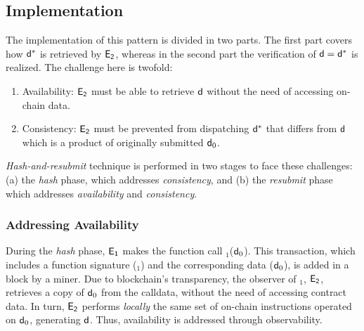 \subsection{Implementation} The implementation of this pattern is
divided in two parts. The first part covers how $\mathsf{d^*}$ is retrieved by
$\mathsf{E_{2}}$, whereas in the second part the verification of $\mathsf{d}=\mathsf{d^*}$ is
realized. The challenge here is twofold:

\begin{enumerate}

    \item Availability: $\mathsf{E_{2}}$ must be able to retrieve $\mathsf{d}$ without
        the need of accessing on-chain data.

    \item Consistency: $\mathsf{E_{2}}$ must be prevented from dispatching $\mathsf{d^*}$
        that differs from $\mathsf{d}$ which is a product of originally submitted
        $\mathsf{d}_0$.

\end{enumerate}

\emph{Hash-and-resubmit} technique is performed in two
stages to face these challenges: (a) the \emph{hash} phase, which addresses
\emph{consistency}, and (b) the \emph{resubmit} phase which addresses
\emph{availability} and \emph{consistency}.

\subsubsection{Addressing Availability} During the \emph{hash} phase,
$\mathsf{E_{1}}$ makes the function call \texttt{\proc}$_1$($\mathsf{d}_0$). This
transaction, which includes a function signature (\texttt{\proc$_1$}) and the
corresponding data ($\mathsf{d}_0$), is added in a block by a miner. Due to
blockchain's transparency, the observer of \texttt{\proc}$_1$, $\mathsf{E_{2}}$,
retrieves a copy of $\mathsf{d}_0$ from the calldata, without the need of accessing contract data. In
turn, $\mathsf{E_{2}}$ performs \emph{locally} the same set of on-chain instructions
operated on $\mathsf{d}_0$, generating $\mathsf{d}$. Thus, availability is addressed
through observability.

